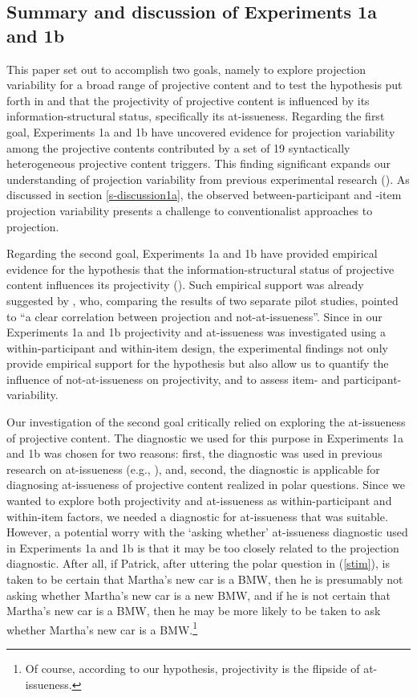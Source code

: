 \documentclass[11pt,fleqn]{article}
\newcommand{\6}{\mbox{$[\hspace*{-.6mm}[$}}
\newcommand{\9}{\mbox{$]\hspace*{-.6mm}]$}}
\begin{document}
\subsection{Summary and discussion of Experiments 1a and 1b}

This paper set out to accomplish two goals, namely to explore projection variability for a broad range of projective content and to test the hypothesis put forth in \citealt{brst-salt10} and \citealt{brst-ar} that the projectivity of projective content is influenced by its information-structural status, specifically its at-issueness. Regarding the first goal, Experiments 1a and 1b have uncovered evidence for projection variability among the projective contents contributed by a set of 19 syntactically heterogeneous projective content triggers. This finding significant expands our understanding of projection variability from previous experimental research (\citealt{xue-onea11,smith-hall11}). As discussed in section \ref{s-discussion1a}, the observed between-participant and -item projection variability presents a challenge to conventionalist approaches to projection. 

Regarding the second goal, Experiments 1a and 1b have provided empirical evidence for the hypothesis that the information-structural status of projective content influences its projectivity (\citealt{brst-salt10,brst-ar}). Such empirical support was already suggested by \citet[180]{xue-onea11}, who, comparing the results of two separate pilot studies, pointed to ``a clear correlation between projection and not-at-issueness''. Since in our Experiments 1a and 1b projectivity and at-issueness was investigated using a within-participant and within-item design, the experimental findings not only provide empirical support for the hypothesis but also allow us to quantify the influence of not-at-issueness on projectivity, and to assess item- and participant-variability.

Our investigation of the second goal critically relied on exploring the at-issueness of projective content. The diagnostic we used for this purpose in Experiments 1a and 1b was chosen for two reasons: first, the diagnostic was used in previous research on at-issueness (e.g., \citealt{amaral-etal07,tonhauser-sula6}), and, second, the diagnostic is applicable for diagnosing at-issueness of projective content realized in polar questions. Since we wanted to explore both projectivity and at-issueness as within-participant and within-item factors, we needed a diagnostic for at-issueness that was suitable. However, a potential worry with the `asking whether' at-issueness diagnostic used in Experiments 1a and 1b is that it may be too closely related to the projection diagnostic. After all, if Patrick, after uttering the polar question in (\ref{stim}), is taken to be certain that Martha's new car is a BMW, then he is presumably not asking whether Martha's new car is a new BMW, and if he is not certain that Martha's new car is a BMW, then he may be more likely to be taken to ask whether Martha's new car is a BMW.\footnote{Of course, according to our hypothesis, projectivity is the flipside of at-issueness.}
\end{document}

